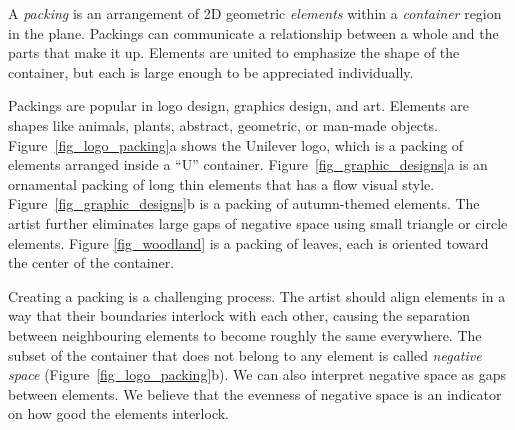 



A \textit{packing} is an arrangement of 2D geometric
\textit{elements} within a \textit{container} region in the plane.
Packings can communicate a relationship between a whole and the parts that make it up.
Elements are united to emphasize the shape of the container,
but each is large enough to be appreciated individually.

Packings are popular in logo design, graphics design, and art.
Elements are shapes like animals, plants, abstract, geometric, or man-made objects.
Figure~\ref{fig_logo_packing}a shows the Unilever logo,
which is a packing of elements arranged inside a ``U'' container.
Figure~\ref{fig_graphic_designs}a is an ornamental packing
of long thin elements that has a flow visual style.
Figure~\ref{fig_graphic_designs}b is a packing
of autumn-themed elements. The artist further eliminates large gaps of
negative space using small triangle or circle elements.
Figure \ref{fig_woodland} is a packing of leaves, each is oriented toward the center of the container.


Creating a packing is a challenging process.
The artist should align elements in a way that their boundaries interlock with each other,
causing the separation between neighbouring elements to become roughly the same everywhere.
The subset of the container that does not belong to any element is
called \textit{negative space} (Figure~\ref{fig_logo_packing}b).
We can also interpret negative space as gaps between elements.
We believe that the evenness of negative space is an indicator on how good the elements interlock.

